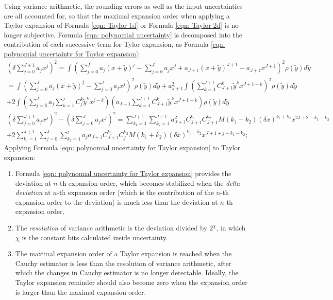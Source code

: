 \documentclass[twoside]{article}
\numberwithin{equation}{section}
\begin{document}
Using variance arithmetic, the rounding errors as well as the input uncertainties are all accounted for, so that the maximal expansion order when applying a Taylor expansion of Formula \eqref{eqn: Taylor 1d} or Formula \eqref{eqn: Taylor 2d}  is no longer subjective.  Formula \eqref{eqn: polynomial uncertainty} is decomposed into the contribution of each successive term for Tylor expansion, as Formula \eqref{eqn: polynomial uncertainty for Taylor expansion}:
\begin{multline}
\label{eqn: polynomial uncertainty for Taylor expansion}
(\delta \sum_{j=0}^{J+1} a_j x^j)^2 
= \int (\sum_{j=0}^{J} a_j (x + \widetilde{y})^j - \sum_{j=0}^{J} a_j x^j + a_{J+1} (x + \widetilde{y})^{J+1} - a_{J+1} x^{J+1})^2 \rho(\widetilde{y}) d \widetilde{y} \\
= \int (\sum_{j=0}^{J} a_j (x + \widetilde{y})^j - \sum_{j=0}^{J} a_j x^j)^2 \rho(\widetilde{y}) d \widetilde{y} +
    a_{J+1}^2 \int (\sum_{k=1}^{J+1} C_{J+1}^{k} \widetilde{y}^k x^{J+1-k})^2 \rho(\widetilde{y}) d \widetilde{y} \\
+2 \int (\sum_{j=0}^{J} a_j \sum_{k=1}^{j} 
   C_{j}^{k} \widetilde{y}^k x^{j-k})(a_{J+1} \sum_{k=1}^{J+1} C_{J+1}^{k} \widetilde{y}^k x^{J+1-k})
   \rho(\widetilde{y}) d \widetilde{y} \\
(\delta \sum_{j=0}^{J+1} a_j x^j)^2 - (\delta \sum_{j=0}^{J} a_j x^j)^2 = 
\sum_{k_1=1}^{J+1} \sum_{k_2=1}^{J+1} a_{J+1}^2 C_{J+1}^{k_1} C_{J+1}^{k_2} M(k_1+k_2) (\delta x)^{k_1+k_2} x^{2J+2-k_1-k_2} \\
+ 2 \sum_{k_1=1}^{J+1} \sum_{j=0}^{J} \sum_{k_2=1}^{j} a_j a_{J+1} C_{J+1}^{k_1} C_{j}^{k_2} 
   M(k_1+k_2) (\delta x)^{k_1+k_2} x^{J+1+j - k_1 -k_2};
\end{multline} 
Applying Formula \eqref{eqn: polynomial uncertainty for Taylor expansion} to Taylor expansion:
\begin{enumerate}
\item Formula \eqref{eqn: polynomial uncertainty for Taylor expansion} provides the deviation at $n$-th expansion order, which becomes stabilized when the \emph{delta deviation} at $n$-th expansion order (which is the contribution of the $n$-th expansion order to the deviation) is much less than the deviation at $n$-th expansion order. 

\item The \emph{resolution} of variance arithmetic is the deviation divided by $2^\chi$, in which $\chi$ is the constant bits calculated inside uncertainty.

\item The maximal expansion order of a Taylor expansion is reached when the Cauchy estimator is less than the resolution of variance arithmetic, after which the changes in Cauchy estimator is no longer detectable.  Ideally, the Taylor expansion reminder should also become zero when the expansion order is larger than the maximal expansion order.
\end{enumerate}
\end{document}
